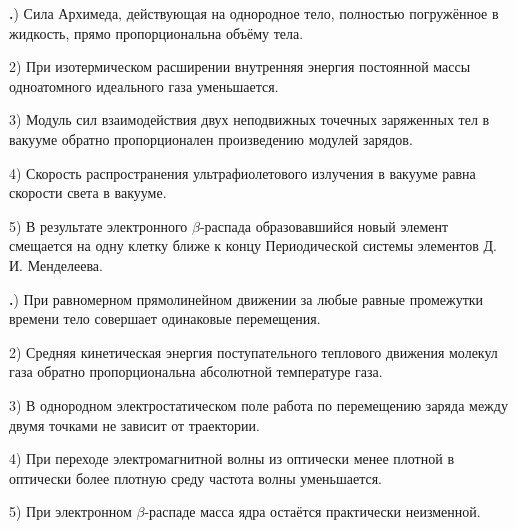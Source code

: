 \documentclass[12pt,a4paper]{article}
\newif\ifShowSolutions
\newcounter{banktask}
\newcommand{\BankTask}[3]{%
  \refstepcounter{banktask}%
  \Needspace{35mm}\par\medskip\noindent\begin{minipage}{\linewidth}%
  \noindent\textbf{\thebanktask.}\quad #2\par
  \ifShowSolutions
    #3\par
    \ifdefined\TutorEdition
      \ifcsname TutorSource#1\endcsname
        \smallskip{\small\csname TutorSource#1\endcsname\par}%
      \fi
    \fi
  \fi
  \end{minipage}\par\medskip
}
\begin{document}
\BankTask{2449F3}{
1) Сила Архимеда, действующая на однородное тело, полностью погружённое в жидкость, прямо пропорциональна объёму тела.

2) При изотермическом расширении внутренняя энергия постоянной массы одноатомного идеального газа уменьшается.

3) Модуль сил взаимодействия двух неподвижных точечных заряженных тел в вакууме обратно пропорционален произведению модулей зарядов.

4) Скорость распространения ультрафиолетового излучения в вакууме равна скорости света в вакууме.

5) В результате электронного \(\beta\)-распада образовавшийся новый элемент смещается на одну клетку ближе к концу Периодической системы элементов Д.\,И. Менделеева.
}{
\smallskip\noindent\textbf{Решение от GPT}\par
1) Верно: для полностью погружённого тела \(F_{\text{А}}=\rho_{\text{ж}}gV\), поэтому сила прямо пропорциональна объёму тела. 2) Неверно: \(U=\frac32\nu RT\), а при изотермическом процессе температура и внутренняя энергия постоянны. 3) Неверно: по закону Кулона \(F=k\frac{|q_1q_2|}{r^2}\), то есть сила прямо пропорциональна произведению модулей зарядов. 4) Верно: ультрафиолетовое излучение является электромагнитным и распространяется в вакууме со скоростью \(c\). 5) Верно: при электронном \(\beta\)-распаде \(Z\) увеличивается на единицу, поэтому элемент смещается на одну клетку к концу таблицы. Ответ: \(1,\ 4,\ 5\).
}

\BankTask{8213F0}{
1) При равномерном прямолинейном движении за любые равные промежутки времени тело совершает одинаковые перемещения.

2) Средняя кинетическая энергия поступательного теплового движения молекул газа обратно пропорциональна абсолютной температуре газа.

3) В однородном электростатическом поле работа по перемещению заряда между двумя точками не зависит от траектории.

4) При переходе электромагнитной волны из оптически менее плотной в оптически более плотную среду частота волны уменьшается.

5) При электронном \(\beta\)-распаде масса ядра остаётся практически неизменной.
}{
\smallskip\noindent\textbf{Решение от GPT}\par
1) Верно: \(\Delta\vec r=\vec v\Delta t\), и при постоянной скорости равным промежуткам времени соответствуют одинаковые перемещения. 2) Неверно: \(\langle E_{\text{к}}\rangle=\frac32 k_{\text{B}}T\), то есть энергия прямо пропорциональна абсолютной температуре. 3) Верно: электростатическое поле потенциально, и работа \(A=q(\varphi_1-\varphi_2)\) зависит только от начальной и конечной точек. 4) Неверно: при переходе между средами частота сохраняется, изменяются скорость и длина волны. 5) Верно: при электронном \(\beta\)-распаде число нуклонов сохраняется, поэтому масса ядра меняется лишь незначительно. Ответ: \(1,\ 3,\ 5\).
}
\end{document}

